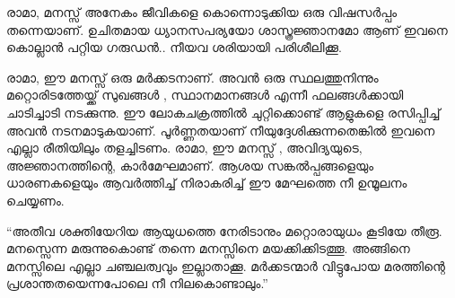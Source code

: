 രാമാ, മനസ്സ് അനേകം ജീവികളെ കൊന്നൊടുക്കിയ ഒരു വിഷസര്‍പ്പം തന്നെയാണ്. ഉചിതമായ ധ്യാനസപര്യയോ ശാസ്ത്രജ്ഞാനമോ ആണ് ഇവനെ കൊല്ലാന്‍ പറ്റിയ ഗരുഡന്‍.. നീയവ ശരിയായി പരിശീലിക്കൂ.

രാമാ, ഈ മനസ്സ് ഒരു മര്‍ക്കടനാണ്. അവന്‍ ഒരു സ്ഥലത്തുനിന്നും മറ്റൊരിടത്തേയ്ക്ക് സുഖങ്ങള്‍ , സ്ഥാനമാനങ്ങള്‍ എന്നീ ഫലങ്ങള്‍ക്കായി ചാടിച്ചാടി നടക്കുന്നു. ഈ ലോകചക്രത്തില്‍ ചുറ്റിക്കൊണ്ട് ആളുകളെ രസിപ്പിച്ച് അവന്‍ നടനമാടുകയാണ്. പൂര്‍ണ്ണതയാണ് നീയുദ്ദേശിക്കുന്നതെങ്കില്‍ ഇവനെ എല്ലാ രീതിയിലും തളച്ചിടണം. 
രാമാ, ഈ മനസ്സ് , അവിദ്യയുടെ, അജ്ഞാനത്തിന്റെ, കാര്‍മേഘമാണ്. ആശയ സങ്കല്‍പ്പങ്ങളെയും ധാരണകളെയും ആവര്‍ത്തിച്ച് നിരാകരിച്ച് ഈ മേഘത്തെ നീ ഉന്മൂലനം ചെയ്യണം.

“അതീവ ശക്തിയേറിയ ആയുധത്തെ നേരിടാനും മറ്റൊരായുധം കൂടിയേ തീരൂ. മനസ്സെന്ന മരുന്നുകൊണ്ട് തന്നെ മനസ്സിനെ മയക്കിക്കിടത്തൂ. അങ്ങിനെ മനസ്സിലെ എല്ലാ ചഞ്ചലത്വവും ഇല്ലാതാക്കൂ. മര്‍ക്കടന്മാര്‍ വിട്ടുപോയ മരത്തിന്റെ പ്രശാന്തതയെന്നപോലെ നീ നിലകൊണ്ടാലും.”


